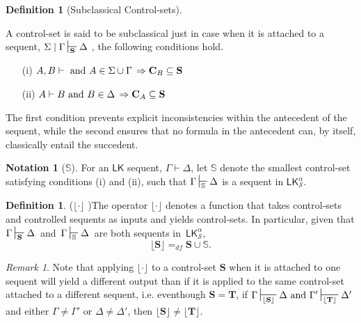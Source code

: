 \documentclass{article}                     %
\theoremstyle{theorem}
\theoremstyle{corollary}
\theoremstyle{lemma}
\theoremstyle{definition}
\newtheorem{definition}[section]{Definition}
\theoremstyle{remark}
\newtheorem{remark}{Remark}
\theoremstyle{definition}
\theoremstyle{notation}
\newtheorem{notation}{Notation}
\theoremstyle{definition}
\theoremstyle{proposition}
\theoremstyle{definition}
\begin{document}
\begin{definition}[Subclassical Control-sets] \label{Sc_Cs} 

A control-set is said to be subclassical just in case when it is attached to a sequent, $ \Sigma\mid\Gamma\sststile{\mathbf{S}}{} \Delta $ , the following conditions hold. 

\end{definition}

\begin{enumerate}
                    
                
\item[(i)] $ A, B  \vdash  \text{\,\,and\,\,} A \in \Sigma\cup\Gamma \,\Rightarrow \mathbf{C}_B \subseteq \mathbf{S} $ \\
 
\item[(ii)] $A \vdash B  \text{\,\,and\,\,} B \in \Delta\,\Rightarrow \mathbf{C}_A \subseteq \mathbf{S} $\\

\end{enumerate}
\vspace{-3mm}

The first condition prevents explicit inconsistencies within the antecedent of the sequent, while the second ensures that no formula in the antecedent can, by itself, classically entail the succedent. 


\begin{notation}[$\mathbb{S} $]
For an $ \mathsf{LK} $ sequent, $ \Gamma \vdash \Delta $, let $\mathbb{S}$ denote the smallest control-set satisfying conditions (i) and (ii), such that $ \Gamma\sststile{\mathbb{S}}{} \Delta $ is a sequent in $ \mathsf{LK}^\alpha_\mathcal{S} $.
\end{notation}

\begin{definition}($ \lfloor \cdot \rfloor $ )\label{Sc_Op}
The operator $ \lfloor \cdot \rfloor $ denotes a function that takes control-sets and controlled sequents as inputs and yields control-sets. In particular, given that $ \Gamma\sststile{\mathbf{S}}{} \Delta $ \,and\, $ \Gamma\sststile{\mathbb{S}}{} \Delta $\, are both sequents in \,$\mathsf{LK}^\alpha_\mathcal{S},\,$
$$ \lfloor\mathbf{S}\rfloor  =_{df} \mathbf{S} \cup \mathbb{S}. $$

\begin{remark}
Note that applying $ \lfloor \cdot \rfloor $ to a control-set $ \mathbf{S} $ when it is attached to one sequent will yield a different output than if it is applied to the same control-set  attached to a different sequent, i.e. eventhough $\mathbf{S} = \mathbf{T}$, if $\Gamma\sststile{\lfloor\mathbf{S}\rfloor}{} \Delta \,\,\text{and}\,\, \Gamma'\sststile{\lfloor\mathbf{T}\rfloor}{} \Delta'$ and either $\Gamma\neq \Gamma' $ or $\Delta\neq\Delta'$, then $\lfloor\mathbf{S}\rfloor \neq \lfloor\mathbf{T}\rfloor$.
\end{remark}

\end{definition}
\end{document}
